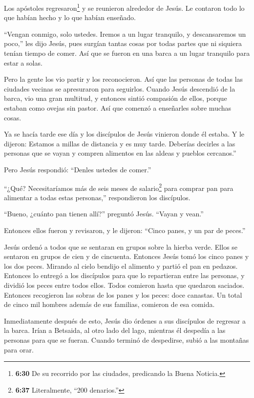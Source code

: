  Los apóstoles regresaron\footnote{\textbf{6:30} De su
  recorrido por las ciudades, predicando la Buena Noticia.} y se
reunieron alrededor de Jesús. Le contaron todo lo que habían hecho y lo
que habían enseñado.

 ``Vengan conmigo, solo ustedes. Iremos a un lugar
tranquilo, y descansaremos un poco,'' les dijo Jesús, pues surgían
tantas cosas por todas partes que ni siquiera tenían tiempo de comer.
 Así que se fueron en una barca a un lugar tranquilo para
estar a solas.

 Pero la gente los vio partir y los reconocieron. Así que
las personas de todas las ciudades vecinas se apresuraron para
seguirlos.  Cuando Jesús descendió de la barca, vio una
gran multitud, y entonces sintió compasión de ellos, porque estaban como
ovejas sin pastor. Así que comenzó a enseñarles sobre muchas cosas.

 Ya se hacía tarde ese día y los discípulos de Jesús
vinieron donde él estaba. Y le dijeron: Estamos a millas de distancia y
es muy tarde.  Deberías decirles a las personas que se
vayan y compren alimentos en las aldeas y pueblos cercanos.''

 Pero Jesús respondió: ``Denles ustedes de comer.''

``¿Qué? Necesitaríamos más de seis meses de salario\footnote{\textbf{6:37}
  Literalmente, ``200 denarios.''} para comprar pan para alimentar a
todas estas personas,'' respondieron los discípulos.

 ``Bueno, ¿cuánto pan tienen allí?'' preguntó Jesús.
``Vayan y vean.''

Entonces ellos fueron y revisaron, y le dijeron: ``Cinco panes, y un par
de peces.''

 Jesús ordenó a todos que se sentaran en grupos sobre la
hierba verde.  Ellos se sentaron en grupos de cien y de
cincuenta.  Entonces Jesús tomó los cinco panes y los dos
peces. Mirando al cielo bendijo el alimento y partió el pan en pedazos.
Entonces lo entregó a los discípulos para que lo repartieran entre las
personas, y dividió los peces entre todos ellos.  Todos
comieron hasta que quedaron saciados.  Entonces recogieron
las sobras de los panes y los peces: doce canastas.  Un
total de cinco mil hombres además de sus familias, comieron de esa
comida.

 Inmediatamente después de esto, Jesús dio órdenes a sus
discípulos de regresar a la barca. Irían a Betsaida, al otro lado del
lago, mientras él despedía a las personas para que se fueran.
 Cuando terminó de despedirse, subió a las montañas para
orar.

